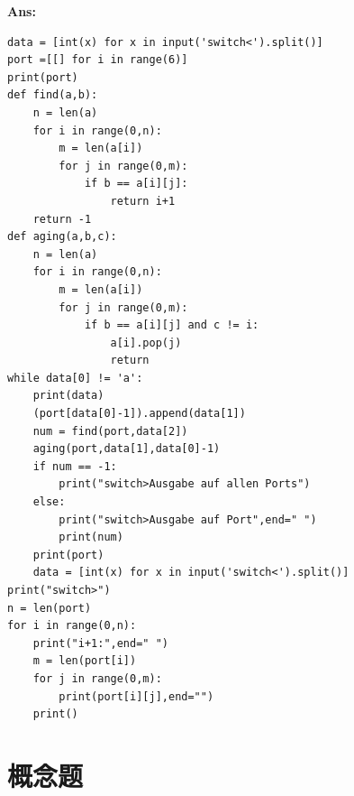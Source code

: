 \documentclass[fleqn]{article}
\begin{document}

\textbf{Ans:}

\begin{lstlisting}
data = [int(x) for x in input('switch<').split()]
port =[[] for i in range(6)]
print(port)
def find(a,b):
    n = len(a)
    for i in range(0,n):
        m = len(a[i])
        for j in range(0,m):
            if b == a[i][j]:
                return i+1
    return -1
def aging(a,b,c):
    n = len(a)
    for i in range(0,n):
        m = len(a[i])
        for j in range(0,m):
            if b == a[i][j] and c != i:
                a[i].pop(j)
                return
while data[0] != 'a':
    print(data)
    (port[data[0]-1]).append(data[1])
    num = find(port,data[2])
    aging(port,data[1],data[0]-1)
    if num == -1:
        print("switch>Ausgabe auf allen Ports")
    else:
        print("switch>Ausgabe auf Port",end=" ")
        print(num)
    print(port)
    data = [int(x) for x in input('switch<').split()]
print("switch>")
n = len(port)
for i in range(0,n):
    print("i+1:",end=" ")
    m = len(port[i])
    for j in range(0,m):
        print(port[i][j],end="")
    print()
\end{lstlisting}

\clearpage

\section{概念题}
\end{document}
